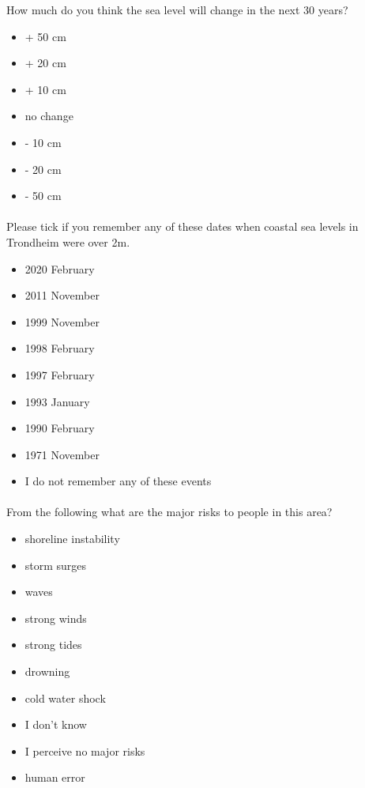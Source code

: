 How much do you think the sea level will change in the next 30 years?
\begin{itemize}
    \item + 50 cm
    \item + 20 cm
    \item + 10 cm
    \item no change
    \item - 10 cm
    \item - 20 cm 
    \item - 50 cm 
\end{itemize}
\paragraph{}

Please tick if you remember any of these dates when coastal sea levels in Trondheim were over 2m.
\begin{itemize}
    \item 2020 February
    \item 2011 November
    \item 1999 November
    \item 1998 February
    \item 1997 February
    \item 1993 January
    \item 1990 February
    \item 1971 November
    \item I do not remember any of these events
\end{itemize}
\paragraph{}

From the following what are the major risks to people in this area?
\begin{itemize}
    \item shoreline instability
    \item storm surges
    \item waves
    \item strong winds
    \item strong tides
    \item drowning
    \item cold water shock
    \item I don't know
    \item I perceive no major risks
    \item human error
\end{itemize}

